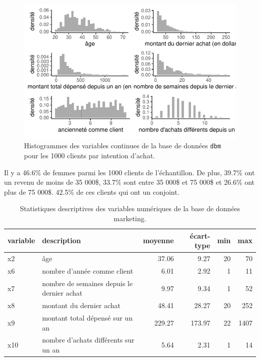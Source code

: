 \documentclass[
  11pt,
  letterpaper,
]{scrbook}
\theoremstyle{definition}
\theoremstyle{remark}
\begin{document}
\begin{figure}[ht!]

{\centering \includegraphics[width=1\textwidth,height=\textheight]{selectionmodeles_files/figure-pdf/fig-histogrammes-eda-dbm-1.pdf}

}

\caption{\label{fig-histogrammes-eda-dbm}Histogrammes des variables
continues de la base de données \texttt{dbm} pour les 1000 clients par
intention d'achat.}

\end{figure}

Il y a 46.6\% de femmes parmi les 1000 clients de l'échantillon. De
plus, 39.7\% ont un revenu de moins de 35 000\$, 33.7\% sont entre 35
000\$ et 75 000\$ et 26.6\% ont plus de 75 000\$. 42.5\% de ces clients
qui ont un conjoint.

\hypertarget{tbl-statdescript-dbm}{}
\begin{table}
\caption{\label{tbl-statdescript-dbm}Statistiques descriptives des variables numériques de la base de données
marketing. }\tabularnewline

\centering
\begin{tabular}{llrrrr}
\toprule
variable & description & moyenne & écart-type & min & max\\
\midrule
x2 & âge & 37.06 & 9.27 & 20 & 70\\
x6 & nombre d’année comme client & 6.01 & 2.92 & 1 & 11\\
x7 & nombre de semaines depuis le dernier achat & 9.97 & 9.34 & 1 & 52\\
x8 & montant du dernier achat & 48.41 & 28.27 & 20 & 252\\
x9 & montant total dépensé sur un an & 229.27 & 173.97 & 22 & 1407\\
x10 & nombre d'achats différents sur un an & 5.64 & 2.31 & 1 & 14\\
\bottomrule
\end{tabular}
\end{table}
\end{document}
